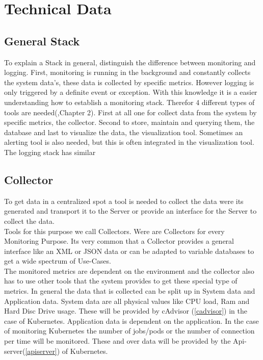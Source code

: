 
\chapter{Technical Data}
\label{chap:ch2}
\section{General Stack}
To explain a Stack in general, distinguish the difference between monitoring and logging. First, monitoring is running in the background and constantly collects the system data's, these data is collected by specific metrics. However logging is only triggered by a definite event or exception.
With this knowledge it is a easier understanding how to establish a monitoring stack. Therefor 4 different types of tools are needed(\cite{cau37427},Chapter 2).
First at all one for collect data from the system by specific metrics, the collector. Second to store, maintain and querying them, the database and last to visualize the data, the visualization tool. Sometimes an alerting tool is also needed, but this is often integrated in the visualization tool.
The logging stack has similar 

\section{Collector}
To get data in a centralized spot a tool is needed to collect the data were its generated and transport it to the Server or provide an interface for the Server to collect the data.\\
Tools for this purpose we call Collectors. Were are Collectors for every Monitoring Purpose. Its very common that a Collector provides a general interface like an XML or JSON data or can be adapted to variable databases to get a wide spectrum of Use-Cases.\\
 The monitored metrics are dependent on the environment and the collector also has to use other tools that the system provides  to get these special type of metrics. In general the data that is collected can be split up in System data and Application data. System data are all physical values like CPU load, Ram and Hard Disc Drive usage. These will be provided by cAdvisor (\ref{cadvisor}) in the case of Kubernetes. Application data is dependent on the application. In the case of monitoring Kubernetes the number of jobs/pods or the number of connection per time will be monitored. These and over data will be provided by the Api-server(\ref{apiserver}) of Kubernetes.
